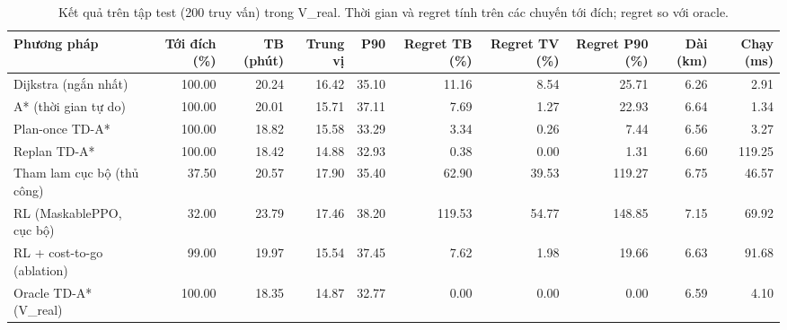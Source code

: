 \begin{table}[!htbp]
\centering
\small
\caption{Kết quả trên tập test (200 truy vấn) trong V\_real. Thời gian và regret tính trên các chuyến tới đích; regret so với oracle.}
\label{tab:tab_main_results}
\begin{adjustbox}{max width=\linewidth}
\begin{tabular}{lrrrrrrrrr}
\toprule
Phương pháp & Tới đích (\%) & TB (phút) & Trung vị & P90 & Regret TB (\%) & Regret TV (\%) & Regret P90 (\%) & Dài (km) & Chạy (ms) \\
\midrule
Dijkstra (ngắn nhất) & 100.00 & 20.24 & 16.42 & 35.10 & 11.16 & 8.54 & 25.71 & 6.26 & 2.91 \\
A* (thời gian tự do) & 100.00 & 20.01 & 15.71 & 37.11 & 7.69 & 1.27 & 22.93 & 6.64 & 1.34 \\
Plan-once TD-A* & 100.00 & 18.82 & 15.58 & 33.29 & 3.34 & 0.26 & 7.44 & 6.56 & 3.27 \\
Replan TD-A* & 100.00 & 18.42 & 14.88 & 32.93 & 0.38 & 0.00 & 1.31 & 6.60 & 119.25 \\
Tham lam cục bộ (thủ công) & 37.50 & 20.57 & 17.90 & 35.40 & 62.90 & 39.53 & 119.27 & 6.75 & 46.57 \\
RL (MaskablePPO, cục bộ) & 32.00 & 23.79 & 17.46 & 38.20 & 119.53 & 54.77 & 148.85 & 7.15 & 69.92 \\
RL + cost-to-go (ablation) & 99.00 & 19.97 & 15.54 & 37.45 & 7.62 & 1.98 & 19.66 & 6.63 & 91.68 \\
Oracle TD-A* (V\_real) & 100.00 & 18.35 & 14.87 & 32.77 & 0.00 & 0.00 & 0.00 & 6.59 & 4.10 \\
\bottomrule
\end{tabular}
\end{adjustbox}
\end{table}
